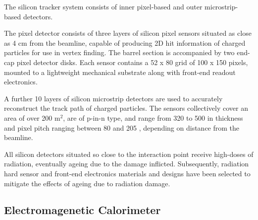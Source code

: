 

The silicon tracker system consists of inner pixel-based and outer microstrip-
based detectors.

The pixel detector consists of three layers of silicon pixel sensors situated 
as close as 4 cm from the beamline, capable 
of producing 2D hit information of charged particles for use in vertex 
finding. The barrel section is accompanied by two end-cap pixel detector 
disks. Each sensor contains a 52 x 80 grid of 100 \microm x 150 \microm pixels, 
mounted to a lightweight mechanical substrate along with front-end readout 
electronics.

A further 10 layers of silicon microstrip detectors are used to accurately 
reconstruct the track path of charged particles. The sensors collectively cover 
an area of over 200 $\text{m}^2$, are of p-in-n type, and range from 320 \microm
to 500 \microm in thickness and pixel pitch ranging between 80 \microm and 
205 \microm, depending on distance from the beamline.

All silicon detectors situated so close to the interaction point receive
high-doses of radiation, eventually ageing due to the damage inflicted. Subsequently, 
radiation hard sensor and front-end electronics materials and designs have been
selected to mitigate the effects of ageing due to radiation damage.

\subsection{Electromagenetic Calorimeter}




